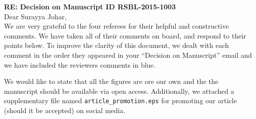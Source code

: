 \documentclass[12pt,letterpaper]{article}
\begin{document}
\textbf{RE: Decision on Manuscript ID RSBL-2015-1003}\\
\bigskip
Dear Surayya Johar,\\
\bigskip
We are very grateful to the four referees for their helpful and constructive comments.
We have taken all of their comments on board, and respond to their points below. To improve the clarity of this document, we dealt with each comment in the order they appeared in your ``Decision on Manuscript'' email and we have included the reviewers comments in blue.

We would like to state that all the figures are ore our own and the the manuscript should be available via open access.
Additionally, we attached a supplementary file named \texttt{article\_promotion.eps} for promoting our article (should it be accepted) on social media. 



\end{document}
